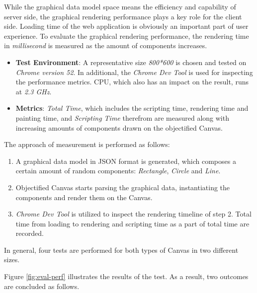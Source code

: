 

While the graphical data model space means the efficiency and capability  of server side, the graphical rendering performance plays a key role for the client side. Loading time of the web application is obviously an important part of user experience. To evaluate the graphical rendering performance, the rendering time in \textit{millisecond} is measured as the amount of components increases.

\begin{itemize}
  \item \textbf{Test Environment}: A representative size \textit{800*600} is chosen and tested on \textit{Chrome version 52}. In additional, the \textit{Chrome Dev Tool} is used for inspecting the performance metrics. CPU, which also has an impact on the result, runs at \textit{2.3 GHz}.
  \item \textbf{Metrics}: \textit{Total Time}, which includes the scripting time, rendering time and painting time, and \textit{Scripting Time} therefrom are measured along with increasing amounts of components drawn on the objectified Canvas. 
\end{itemize}

The approach of measurement is performed as follows:

\begin{enumerate}
  \item A graphical data model in JSON format is generated, which composes a certain amount of random components: \textit{Rectangle}, \textit{Circle} and \textit{Line}.
  \item Objectified Canvas starts parsing the graphical data, instantiating the components and render them on the Canvas.
  \item \textit{Chrome Dev Tool} is utilized to inspect the rendering timeline of step 2. Total time from loading to rendering and scripting time as a part of total time are recorded.
\end{enumerate}
In general, four tests are performed for both types of Canvas in two different sizes. 

Figure \ref{fig:eval-perf} illustrates the results of the test. As a result, two outcomes are concluded as follows.


